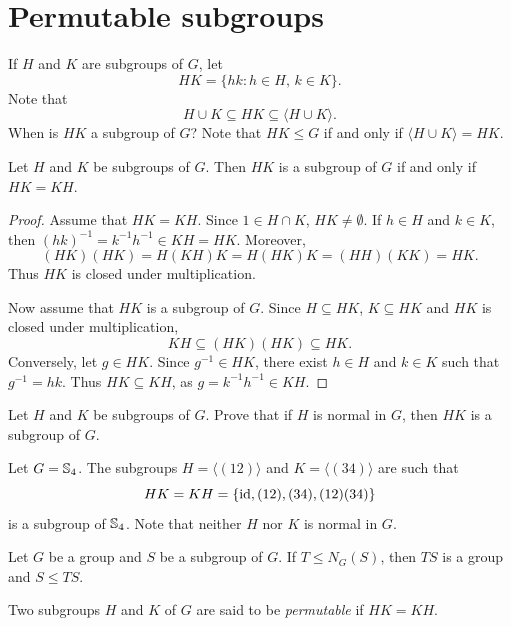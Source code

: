 \section{Permutable subgroups}
\lecture\label{sec:permutable}

If $H$ and $K$ are subgroups of $G$, let 
\[
        HK=\{hk:h\in H,\,k\in K\}.
\]
Note that 
\[
H\cup K\subseteq HK\subseteq\langle H\cup K\rangle.
\]
When is $HK$ a subgroup of $G$? 
Note that $HK\leq G$ if and only if $\langle H\cup K\rangle=HK$.

\begin{proposition}
        Let $H$ and $K$ be subgroups of $G$. Then $HK$ is a subgroup of
        $G$ if and only if $HK=KH$.
\end{proposition}

\begin{proof}
    Assume that $HK=KH$. Since $1\in H\cap K$, $HK\ne\emptyset$. 
    If $h\in H$ and $k\in K$, then $(hk)^{-1}=k^{-1}h^{-1}\in KH=HK$. Moreover, 
    \[
    (HK)(HK)=H(KH)K=H(HK)K=(HH)(KK)=HK.
    \]
    Thus $HK$ is closed under multiplication. 

    Now assume that $HK$ is a subgroup of $G$. Since $H\subseteq HK$,
    $K\subseteq HK$ and $HK$ is closed under multiplication,
        \[
        KH\subseteq (HK)(HK)\subseteq HK.
        \]
        Conversely, let $g\in HK$.
        Since $g^{-1}\in HK$, there exist $h\in H$ and $k\in K$ such that
        $g^{-1}=hk$.
        Thus $HK\subseteq KH$, as 
        $g=k^{-1}h^{-1}\in KH$.
\end{proof}

\begin{exercise}
\label{xca:HK_normal}
Let $H$ and $K$ be subgroups of $G$. Prove that 
if $H$ is normal in $G$, then $HK$ is a subgroup of $G$.
\end{exercise}

\begin{example}
Let $G=\mathbb{S}_4$. The subgroups $H=\langle (12)\rangle$ and $K=\langle (34)\rangle$ are such that 
\[
HK=KH=\{
\operatorname{id},(12),(34),(12)(34)\}
\]
is a subgroup of 
$\mathbb{S}_4$. Note that neither $H$ nor $K$
is normal in $G$.
\end{example}

\begin{exercise}
Let $G$ be a group and $S$ be a subgroup of $G$. 
If $T\leq N_G(S)$, then $TS$ is a group and $S\leq TS$.
\end{exercise}

Two subgroups $H$ and $K$ of $G$ are said to be
\emph{permutable} if $HK=KH$.

